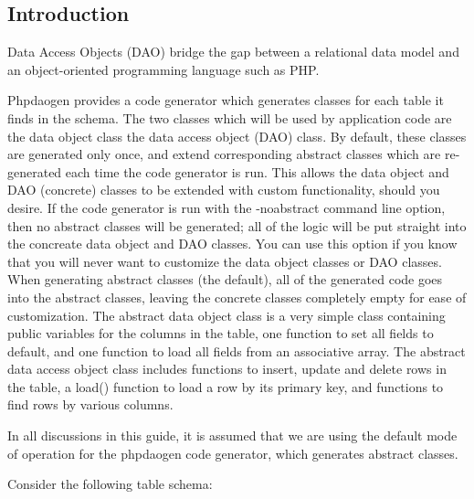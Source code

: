 \documentclass[letterpaper,10pt,english]{sphinxmanual}
\begin{document}
\subsection{Introduction}
\label{jaxFrameworkGuide:id16}
Data Access Objects (DAO) bridge the gap between a relational data model and an object-oriented
programming language such as PHP.

Phpdaogen provides a code generator which generates classes for each table it finds in the schema.
The two classes which will be used by application code are the data object class the data access
object (DAO) class.  By default, these classes are generated only once, and extend corresponding
abstract classes which are re-generated each time the code generator is run.  This allows the data
object and DAO (concrete) classes to be extended with custom functionality, should you desire.  If
the code generator is run with the -noabstract command line option, then no abstract classes will be
generated; all of the logic will be put straight into the concreate data object and DAO classes.
You can use this option if you know that you will never want to customize the data object classes or
DAO classes.  When generating abstract classes (the default), all of the generated code goes into
the abstract classes, leaving the concrete classes completely empty for ease of customization.  The
abstract data object class is a very simple class containing public variables for the columns in the
table, one function to set all fields to default, and one function to load all fields from an
associative array.  The abstract data access object class includes functions to insert, update and
delete rows in the table, a load() function to load a row by its primary key, and functions to find
rows by various columns.

In all discussions in this guide, it is assumed that we are using the default mode of operation for
the phpdaogen code generator, which generates abstract classes.

Consider the following table schema:
\end{document}
